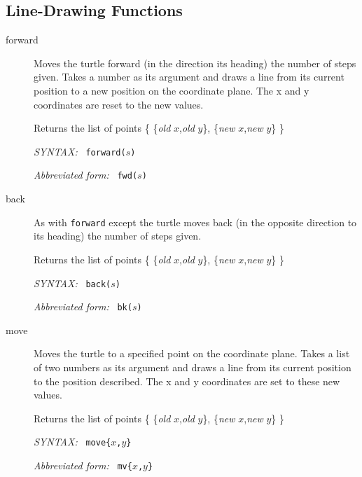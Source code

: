 \documentclass[11pt]{article}
\newcommand{\syntax}{\textsl{SYNTAX: }}
\newcommand{\abb}{\textsl{Abbreviated form: }}
\begin{document}
\subsection{Line-Drawing Functions}
\begin{description}
 \item[forward] Moves the turtle forward (in the direction its heading)
       the number of steps given. Takes a number as its argument and draws
       a line from its current position to a new position on the
       coordinate plane. The x and y coordinates are reset to the new
       values.

       Returns the list of points  
    \{ \{{\it old} $x$,{\it old} $y$\}, \{{\it new} $x$,{\it new} $y$\} \}

       \syntax\ {\tt forward($s$)}
 
       \abb\ {\tt fwd($s$)}
 \item[back] As with {\tt forward} except the turtle moves back (in the
       opposite direction to its heading) the number of steps given.

       Returns the list of points
    \{ \{{\it old} $x$,{\it old} $y$\}, \{{\it new} $x$,{\it new} $y$\} \}

       \syntax\ {\tt back($s$)}

       \abb\ {\tt bk($s$)}
 \item[move] Moves the turtle to a specified point on the coordinate
       plane. Takes a list of two numbers as its argument and draws a line
       from its current position to the position described. The x and y
       coordinates are set to these new values.

       Returns the list of points 
    \{ \{{\it old} $x$,{\it old} $y$\}, \{{\it new} $x$,{\it new} $y$\} \}

       \syntax\ {\tt move\{$x$,$y$\}}

       \abb\ {\tt mv\{$x$,$y$\}}
\end{description}
\end{document}

